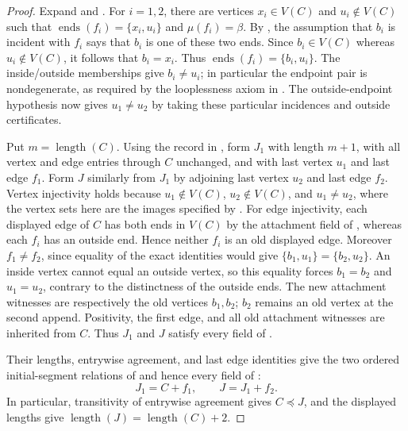 \begin{proof}
Expand  and .  For
$i=1,2$, there are vertices $x_i\in V(C)$ and $u_i\notin V(C)$ such that
$\operatorname{ends}(f_i)=\{x_i,u_i\}$ and $\mu(f_i)=\beta$.  By
, the assumption that $b_i$ is incident with $f_i$ says
that $b_i$ is one of these two ends.  Since $b_i\in V(C)$ whereas
$u_i\notin V(C)$, it follows that $b_i=x_i$.  Thus
$\operatorname{ends}(f_i)=\{b_i,u_i\}$.  The inside/outside memberships
give $b_i\ne u_i$; in particular the endpoint pair is nondegenerate, as
required by the looplessness axiom in .  The
outside-endpoint hypothesis now gives
$u_1\ne u_2$ by taking these particular incidences and outside
certificates.

Put $m=\operatorname{length}(C)$.  Using the record in
, form $J_1$ with length $m+1$, with all vertex and
edge entries through $C$ unchanged, and with last vertex $u_1$ and last
edge $f_1$.  Form $J$ similarly from $J_1$ by adjoining last vertex $u_2$
and last edge $f_2$.  Vertex injectivity holds because $u_1\notin V(C)$,
$u_2\notin V(C)$, and $u_1\ne u_2$, where the vertex sets here are the
images specified by .  For edge
injectivity, each displayed edge of $C$ has both ends in $V(C)$ by the
attachment field of , whereas each $f_i$ has an
outside end.  Hence neither $f_i$ is an old displayed edge.  Moreover
$f_1\ne f_2$, since equality of the exact identities would give
$\{b_1,u_1\}=\{b_2,u_2\}$.  An inside vertex cannot equal an outside
vertex, so this equality forces $b_1=b_2$ and $u_1=u_2$, contrary to the
distinctness of the outside ends.  The
new attachment witnesses are respectively the old vertices $b_1,b_2$;
$b_2$ remains an old vertex at the second append.  Positivity, the first
edge, and all old attachment witnesses are inherited from $C$.  Thus
$J_1$ and $J$ satisfy every field of .

Their lengths, entrywise agreement, and last edge identities give the two
ordered initial-segment relations of
 and hence every field of
:
\[
                         J_1=C+f_1,\qquad J=J_1+f_2.           \tag{1}
\]
In particular, transitivity of entrywise agreement gives $C\preccurlyeq
J$, and the displayed lengths give
$\operatorname{length}(J)=\operatorname{length}(C)+2$.


\end{proof}
